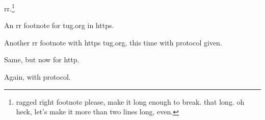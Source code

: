 \documentclass{ltugboat}
\begin{document}
rr.\footnote{\tubraggedfoot ragged right footnote please, make it long
enough to break. that long. oh heck, let's make it more than two lines
long, even.}

An rr footnote for tug.org in https.

Another rr footnote with https tug.org, this time with protocol
given.

Same, but now for http.

Again, with protocol.
\end{document}
